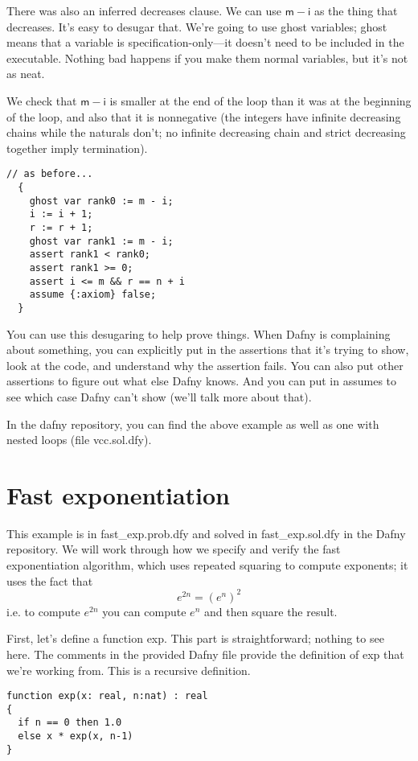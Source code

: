 \documentclass[11pt]{article}
\begin{document}
There was also an inferred \textsf{decreases} clause. We can use $\mathsf{m}-\mathsf{i}$ as
the thing that decreases. It's easy to desugar that. We're going to use ghost variables; ghost means that a variable is
specification-only---it doesn't need to be included in the executable.
Nothing bad happens if you make them normal variables, but it's not as neat.

We check that $\mathsf{m}-\mathsf{i}$ is smaller at the end of the loop than it was at the beginning of the loop,
and also that it is nonnegative (the integers have infinite decreasing chains while the naturals don't; no infinite
decreasing chain and strict decreasing together imply termination).

\begin{lstlisting}[language=dafny]
  // as before...
  {
    ghost var rank0 := m - i;
    i := i + 1;
    r := r + 1;
    ghost var rank1 := m - i;
    assert rank1 < rank0;
    assert rank1 >= 0;
    assert i <= m && r == n + i
    assume {:axiom} false;
  }
\end{lstlisting}

You can use this desugaring to help prove things. When Dafny is complaining about something, you
can explicitly put in the assertions that it's trying to show, look at the code, and understand why the
assertion fails. You can also put other assertions to figure out what else Dafny knows. And you can
put in assumes to see which case Dafny can't show (we'll talk more about that).

In the \textsf{dafny} repository, you can find the above example as well as one with nested loops
(file \textsf{vcc.sol.dfy}).

\section*{Fast exponentiation}

This example is in \textsf{fast\_exp.prob.dfy} and solved in \textsf{fast\_exp.sol.dfy} in the Dafny repository. We will work through how
we specify and verify the fast exponentiation algorithm, which uses repeated squaring to compute exponents; it uses the fact
that
\[ e^{2n} = (e^n)^2 \]
i.e. to compute $e^{2n}$ you can compute $e^n$ and then square the result.

First, let's define a function \textsf{exp}. This part is straightforward; nothing to see here. The comments in the provided Dafny file provide the definition of
\textsf{exp} that we're working from. This is a recursive definition.
\begin{lstlisting}[language=dafny]
function exp(x: real, n:nat) : real
{
  if n == 0 then 1.0
  else x * exp(x, n-1)
}
\end{lstlisting}
\end{document}
